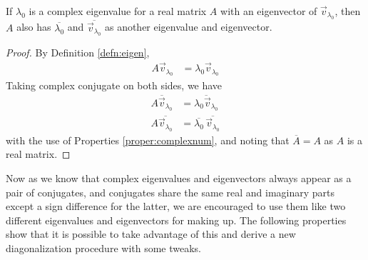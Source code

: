 \begin{proper}
\label{proper:eigenconj}
If $\lambda_0$ is a complex eigenvalue for a real matrix $A$ with an eigenvector of $\vec{v}_{\lambda_0}$, then $A$ also has $\overline{\lambda_0}$ and $\overline{\vec{v}_{\lambda_0}}$ as another eigenvalue and eigenvector.
\end{proper}
\begin{proof}
By Definition \ref{defn:eigen},
\begin{align*}
A\vec{v}_{\lambda_0} &= \lambda_0\vec{v}_{\lambda_0}    
\end{align*}
Taking complex conjugate on both sides, we have
\begin{align*}
\overline{A\vec{v}_{\lambda_0}} &= \overline{\lambda_0\vec{v}_{\lambda_0}} \\
A \overline{\vec{v}_{\lambda_0}} &= \overline{\lambda_0}\, \overline{\vec{v}_{\lambda_0}}
\end{align*}
with the use of Properties \ref{proper:complexnum}, and noting that $\overline{A} = A$ as $A$ is a real matrix.
\end{proof}
Now as we know that complex eigenvalues and eigenvectors always appear as a pair of conjugates, and conjugates share the same real and imaginary parts except a sign difference for the latter, we are encouraged to use them like two different eigenvalues and eigenvectors for making up. The following properties show that it is possible to take advantage of this and derive a new diagonalization procedure with some tweaks.

